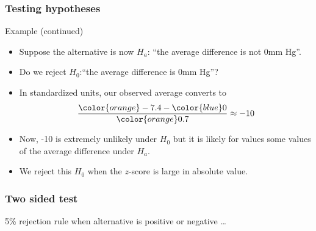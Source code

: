 \documentclass[handout]{beamer}
\begin{document}
   \begin{frame} \frametitle{Testing hypotheses}

   \begin{block}
   {Example (continued)}
   \begin{itemize}

   \item Suppose the alternative is now $H_a$: ``the average difference is not 0mm Hg''.

   \item Do we reject $H_0$:``the average difference is 0mm Hg''?

    \item In standardized units, our observed average converts to
    $$
    \frac{{\color{orange}-7.4} - {\color{blue} 0}}{\color{orange} 0.7} \approx -10
    $$

   \item Now, -10 is extremely unlikely under $H_0$ but it is likely
   for values some values of the average difference under $H_a$.

   \item We reject this $H_0$ when the $z$-score is large in absolute value.
   \end{itemize}
   \end{block}
   \end{frame}



   \begin{frame}
   \frametitle{Two sided test}
   \begin{center}
   \end{center}
   {\color{blue} 5\% rejection rule} when alternative is positive or negative \dots
   \end{frame}
\end{document}
